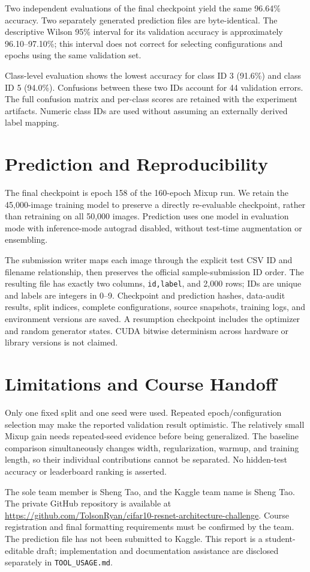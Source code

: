 \documentclass[letterpaper]{article}
\begin{document}
Two independent evaluations of the final checkpoint yield the same 96.64\%
accuracy. Two separately generated prediction files are byte-identical. The
descriptive Wilson 95\% interval for its validation accuracy is approximately
96.10--97.10\%; this interval does not correct for selecting configurations and
epochs using the same validation set.

Class-level evaluation shows the lowest accuracy for class ID 3 (91.6\%) and
class ID 5 (94.0\%). Confusions between these two IDs account for 44 validation
errors. The full confusion matrix and per-class scores are retained with the
experiment artifacts. Numeric class IDs are used without assuming an externally
derived label mapping.

\section{Prediction and Reproducibility}
The final checkpoint is epoch 158 of the 160-epoch Mixup run. We retain the
45,000-image training model to preserve a directly re-evaluable checkpoint,
rather than retraining on all 50,000 images. Prediction uses one model in
evaluation mode with inference-mode autograd disabled, without test-time
augmentation or ensembling.

The submission writer maps each image through the explicit test CSV ID and
filename relationship, then preserves the official sample-submission ID order.
The resulting file has exactly two columns, \texttt{id,label}, and 2,000 rows;
IDs are unique and labels are integers in 0--9. Checkpoint and prediction hashes,
data-audit results, split indices, complete configurations, source snapshots,
training logs, and environment versions are saved. A resumption checkpoint
includes the optimizer and random generator states. CUDA bitwise determinism
across hardware or library versions is not claimed.

\section{Limitations and Course Handoff}
Only one fixed split and one seed were used. Repeated epoch/configuration
selection may make the reported validation result optimistic. The relatively
small Mixup gain needs repeated-seed evidence before being generalized. The
baseline comparison simultaneously changes width, regularization, warmup, and
training length, so their individual contributions cannot be separated. No
hidden-test accuracy or leaderboard ranking is asserted.

The sole team member is Sheng Tao, and the Kaggle team name is Sheng Tao.
The private GitHub repository is available at
\url{https://github.com/TolsonRyan/cifar10-resnet-architecture-challenge}.
Course registration and final
formatting requirements must be confirmed by the team. The prediction file
has not been submitted to Kaggle. This report
is a student-editable draft; implementation and documentation assistance are
disclosed separately in \texttt{TOOL\_USAGE.md}.



\end{document}
